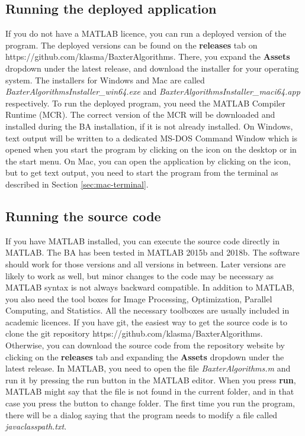 \documentclass[a4paper, oneside, onecolumn, 11pt]{article}
\newcommand{\file}[1]{\emph{#1}}
\newcommand{\command}[1]{\textbf{#1}}
\newcommand{\control}[1]{\textbf{#1}}
\begin{document}
\subsection{Running the deployed application}
\label{sec:run-deployed}
If you do not have a MATLAB licence, you can run a deployed version of the program. The deployed versions can be found on the \control{releases} tab on https://github.com/klasma/BaxterAlgorithms. There, you expand the \control{Assets} dropdown under the latest release, and download the installer for your operating system. The installers for Windows and Mac are called \file{BaxterAlgorithmsInstaller\_win64.exe} and \file{BaxterAlgorithmsInstaller\_maci64.app} respectively. To run the deployed program, you need the MATLAB Compiler Runtime (MCR). The correct version of the MCR will be downloaded and installed during the BA installation, if it is not already installed. On Windows, text output will be written to a dedicated MS-DOS Command Window which is opened when you start the program by clicking on the icon on the desktop or in the start menu. On Mac, you can open the application by clicking on the icon, but to get text output, you need to start the program from the terminal as described in Section \ref{sec:mac-terminal}.

\subsection{Running the source code}
\label{sec:source}
If you have MATLAB installed, you can execute the source code directly in MATLAB. The BA has been tested in MATLAB 2015b and 2018b. The software should work for those versions and all versions in between. Later versions are likely to work as well, but minor changes to the code may be necessary as MATLAB syntax is not always backward compatible. In addition to MATLAB, you also need the tool boxes for Image Processing, Optimization, Parallel Computing, and Statistics. All the necessary toolboxes are usually included in academic licences. If you have git, the easiest way to get the source code is to clone the git repository https://github.com/klasma/BaxterAlgorithms. Otherwise, you can download the source code from the repository website by clicking on the \control{releases} tab and expanding the \control{Assets} dropdown under the latest release. In MATLAB, you need to open the file \file{BaxterAlgorithms.m} and run it by pressing the run button in the MATLAB editor. When you press \command{run}, MATLAB might say that the file is not found in the current folder, and in that case you press the button to change folder. The first time you run the program, there will be a dialog saying that the program needs to modify a file called \file{javaclasspath.txt}.
\end{document}
